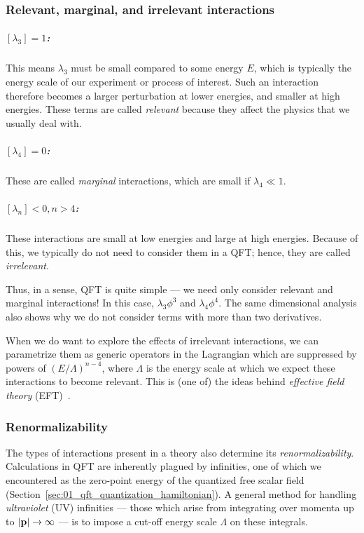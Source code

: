 \subsubsection{Relevant, marginal, and irrelevant interactions}

\subparagraph{$[\lambda_3] = 1$:} This means $\lambda_3$ must be small compared to some energy $E$, which is typically the energy scale of our experiment or process of interest.
Such an interaction therefore becomes a larger perturbation at lower energies, and smaller at high energies.
These terms are called \textit{relevant} because they affect the physics that we usually deal with.

\subparagraph{$[\lambda_4] = 0$:} These are called \textit{marginal} interactions, which are small if $\lambda_4 \ll 1$.

\subparagraph{$[\lambda_n] < 0, n > 4$:} These interactions are small at low energies and large at high energies. 
Because of this, we typically do not need to consider them in a QFT; hence, they are called \textit{irrelevant}.

Thus, in a sense, QFT is quite simple --- we need only consider relevant and marginal interactions! In this case, $\lambda_3 \phi^3$ and $\lambda_4 \phi^4$.
The same dimensional analysis also shows why we do not consider terms with more than two derivatives.

When we do want to explore the effects of irrelevant interactions, we can parametrize them as generic operators in the Lagrangian which are suppressed by powers of $(E/\Lambda)^{n-4}$, where $\Lambda$ is the energy scale at which we expect these interactions to become relevant.
This is (one of) the ideas behind \textit{effective field theory} (EFT)~\cite{Manohar:2018aog, Isidori:2023pyp}.

\subsubsection{Renormalizability} 

The types of interactions present in a theory also determine its \textit{renormalizability}.
Calculations in QFT are inherently plagued by infinities, one of which we encountered as the zero-point energy of the quantized free scalar field (Section~\ref{sec:01_qft_quantization_hamiltonian}).
A general method for handling \textit{ultraviolet} (UV) infinities --- those which arise from integrating over momenta up to $\left\lvert \mathbf{p} \right\rvert \rightarrow \infty$ --- is to impose a cut-off energy scale $\Lambda$ on these integrals.

